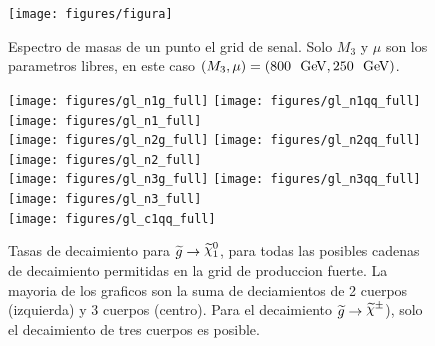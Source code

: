 
\begin{figure}[ht!]
   \centering
   \texttt{[image: figures/figura]} %
   \caption{Espectro de masas de un punto el grid de senal.
     Solo $M_3$ y $\mu$ son los parametros libres, en este caso
     $(M_3, \mu) = (800~\gev, 250~\gev)$. }
   \label{fig:mass_spectra}
\end{figure}

\begin{figure}[ht!] %
   \centering
   \texttt{[image: figures/gl\_n1g\_full]}
   \texttt{[image: figures/gl\_n1qq\_full]}
   \texttt{[image: figures/gl\_n1\_full]} \\
   \texttt{[image: figures/gl\_n2g\_full]}
   \texttt{[image: figures/gl\_n2qq\_full]}
   \texttt{[image: figures/gl\_n2\_full]} \\
   \texttt{[image: figures/gl\_n3g\_full]}
   \texttt{[image: figures/gl\_n3qq\_full]}
   \texttt{[image: figures/gl\_n3\_full]} \\
   \texttt{[image: figures/gl\_c1qq\_full]} \\

   \caption{Tasas de decaimiento para $\gluino \to \ninoone$,
     para todas las posibles cadenas de decaimiento permitidas en la grid
     de produccion fuerte. La mayoria de los graficos son la suma
     de deciamientos de 2 cuerpos (izquierda) y 3 cuerpos (centro).
     Para el decaimiento $\gluino \to \chinopm$), solo el decaimiento de
     tres cuerpos es posible.}
   \label{fig:br_gl_n1}
\end{figure}

